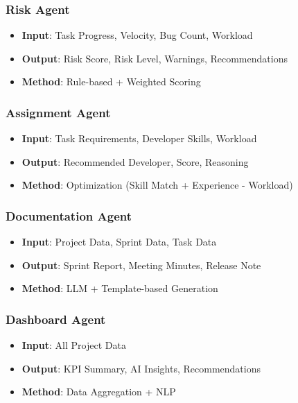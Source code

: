 \documentclass[12pt,a4paper]{report}
\begin{document}
\subsubsection{Risk Agent}

\begin{itemize}
\item \textbf{Input}: Task Progress, Velocity, Bug Count, Workload
\item \textbf{Output}: Risk Score, Risk Level, Warnings, Recommendations
\item \textbf{Method}: Rule-based + Weighted Scoring
\end{itemize}

\subsubsection{Assignment Agent}

\begin{itemize}
\item \textbf{Input}: Task Requirements, Developer Skills, Workload
\item \textbf{Output}: Recommended Developer, Score, Reasoning
\item \textbf{Method}: Optimization (Skill Match + Experience - Workload)
\end{itemize}

\subsubsection{Documentation Agent}

\begin{itemize}
\item \textbf{Input}: Project Data, Sprint Data, Task Data
\item \textbf{Output}: Sprint Report, Meeting Minutes, Release Note
\item \textbf{Method}: LLM + Template-based Generation
\end{itemize}

\subsubsection{Dashboard Agent}

\begin{itemize}
\item \textbf{Input}: All Project Data
\item \textbf{Output}: KPI Summary, AI Insights, Recommendations
\item \textbf{Method}: Data Aggregation + NLP
\end{itemize}
\end{document}
